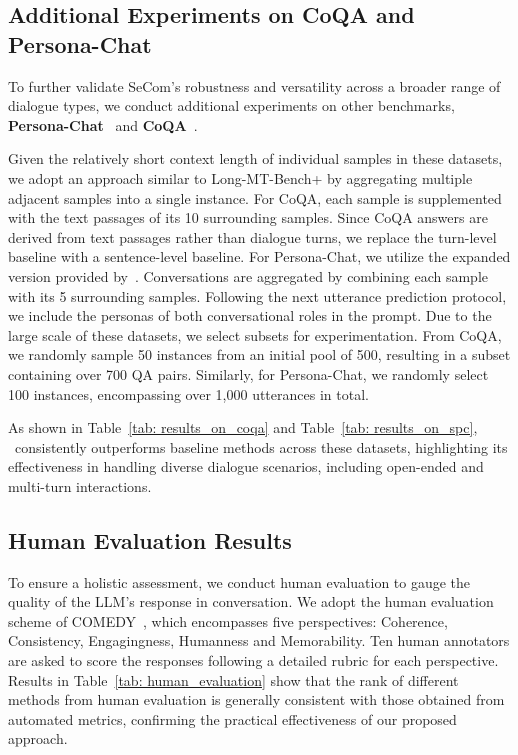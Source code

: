\subsection{Additional Experiments on CoQA and Persona-Chat}

To further validate SeCom's robustness and versatility across a broader range of dialogue types, we conduct additional experiments on other benchmarks, \textbf{Persona-Chat}~\citep{zhang-etal-2018-personalizing} and \textbf{CoQA}~\citep{reddy2019coqa}.

Given the relatively short context length of individual samples in these datasets, we adopt an approach similar to Long-MT-Bench+ by aggregating multiple adjacent samples into a single instance. For CoQA, each sample is supplemented with the text passages of its 10 surrounding samples. Since CoQA answers are derived from text passages rather than dialogue turns, we replace the turn-level baseline with a sentence-level baseline.
For Persona-Chat, we utilize the expanded version provided by~\citet{jandaghi2023faithful}. Conversations are aggregated by combining each sample with its 5 surrounding samples. Following the next utterance prediction protocol, we include the personas of both conversational roles in the prompt. Due to the large scale of these datasets, we select subsets for experimentation. From CoQA, we randomly sample 50 instances from an initial pool of 500, resulting in a subset containing over 700 QA pairs. Similarly, for Persona-Chat, we randomly select 100 instances, encompassing over 1,000 utterances in total. 

As shown in Table~\ref{tab: results_on_coqa} and Table~\ref{tab: results_on_spc}, \sysname\ consistently outperforms baseline methods across these datasets, highlighting its effectiveness in handling diverse dialogue scenarios, including open-ended and multi-turn interactions.




\subsection{Human Evaluation Results}
\label{sec: human_evaluation}

To ensure a holistic assessment, we conduct human evaluation to gauge the quality of the LLM's response in conversation. We adopt the human evaluation scheme of COMEDY~\citep{chen2024compress}, which encompasses five perspectives: Coherence, Consistency, Engagingness, Humanness and Memorability. Ten human annotators are asked to score the responses following a detailed rubric for each perspective. Results in Table~\ref{tab: human_evaluation} show that the rank of different methods from human evaluation is generally consistent with those obtained from automated metrics, confirming the practical effectiveness of our proposed approach. 

